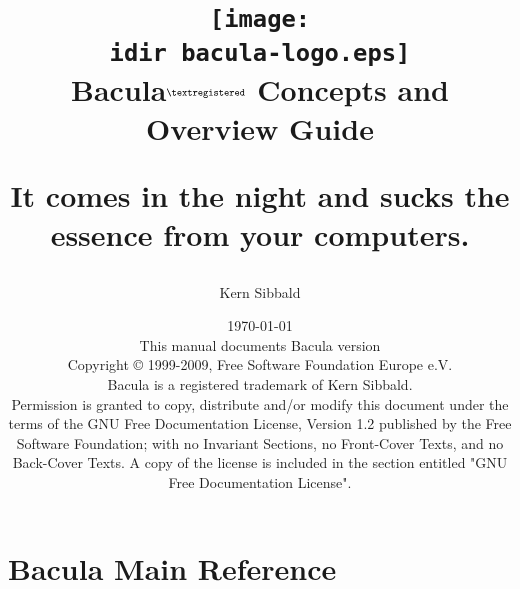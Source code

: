 \documentclass[10pt,a4paper]{book}
\begin{document}
\sloppy

\parskip 10pt
\parindent 0pt

\title{\texttt{[image: \\idir bacula-logo.eps]} \\ \bigskip
  \Huge{Bacula}$^{\normalsize \textregistered}$ \Huge{Concepts and Overview Guide}
  \begin{center}
   \large{It comes in the night and sucks
          the essence from your computers. }
  \end{center}
}


\author{Kern Sibbald}
\date{\vspace{1.0in}\today \\
      This manual documents Bacula version \fullversion \\
      \vspace{0.2in}
      Copyright {\copyright} 1999-2009, Free Software Foundation Europe
      e.V. \\
      Bacula {\textregistered}  is a registered trademark of Kern Sibbald.\\
      \vspace{0.2in}
  Permission is granted to copy, distribute and/or modify this document under the terms of the
  GNU Free Documentation License, Version 1.2 published by the Free Software Foundation;
  with no Invariant Sections, no Front-Cover Texts, and no Back-Cover Texts.
  A copy of the license is included in the section entitled "GNU Free Documentation License".
}

\maketitle

\clearpage
{}
\tableofcontents
\clearpage

\pagestyle{myheadings}

\part{Bacula Main Reference}
 
 
 
 
 
 
 
 
 
 
 
 
 
 
 
 
 
 
 
 
 
 
 
 
















\end{document}
